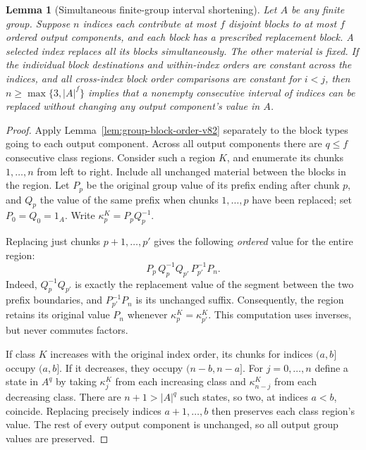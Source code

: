 \documentclass[11pt]{article}
\numberwithin{equation}{section}
\theoremstyle{plain}
\newtheorem{lemma}[theorem]{Lemma}
\theoremstyle{definition}
\theoremstyle{remark}
\theoremstyle{plain}
\begin{document}
\begin{lemma}[Simultaneous finite-group interval shortening]
\label{lem:group-interval-v82}
Let $A$ be any finite group.  Suppose $n$ indices each
contribute at most $f$ disjoint blocks to at most $f$
ordered output components, and each block has a prescribed
replacement block.  A selected index replaces \emph{all}
its blocks simultaneously.  The other material is fixed.
If the individual block destinations and within-index orders
are constant across the indices, and all cross-index block
order comparisons are constant for $i<j$, then
$n\ge\max\{3,|A|^f\}$ implies that a nonempty consecutive
interval of indices can be replaced without changing
any output component's value in $A$.
\end{lemma}
\begin{proof}
Apply Lemma~\ref{lem:group-block-order-v82} separately to
the block types going to each output component.  Across
all output components there are $q\le f$ consecutive
class regions.  Consider such a region $K$, and enumerate
its chunks $1,\ldots,n$ from left to right.  Include all
unchanged material between the blocks in the region.
Let $P_p$ be the original group value of its prefix
ending after chunk $p$, and $Q_p$ the value of the
same prefix when chunks $1,\ldots,p$ have been
replaced; set $P_0=Q_0=1_A$.  Write
$\kappa^K_p=P_pQ_p^{-1}$.

Replacing just chunks $p+1,\ldots,p'$ gives the
following \emph{ordered} value for the entire region:
\[
 P_p\,Q_p^{-1}Q_{p'}\,P_{p'}^{-1}P_n .
\]
Indeed, $Q_p^{-1}Q_{p'}$ is exactly the replacement
value of the segment between the two prefix boundaries,
and $P_{p'}^{-1}P_n$ is its unchanged suffix.
Consequently, the region retains its original value
$P_n$ whenever $\kappa^K_p=\kappa^K_{p'}$.
This computation uses inverses, but never commutes
factors.

If class $K$ increases with the original index order,
its chunks for indices $(a,b]$ occupy $(a,b]$.
If it decreases, they occupy $(n-b,n-a]$.
For $j=0,\ldots,n$ define a state in $A^q$ by taking
$\kappa^K_j$ from each increasing class and
$\kappa^K_{n-j}$ from each decreasing class.
There are $n+1>|A|^q$ such states, so two,
at indices $a<b$, coincide.  Replacing precisely
indices $a+1,\ldots,b$ then preserves each
class region's value.  The rest of every output
component is unchanged, so all output group values
are preserved.
\end{proof}
\end{document}

